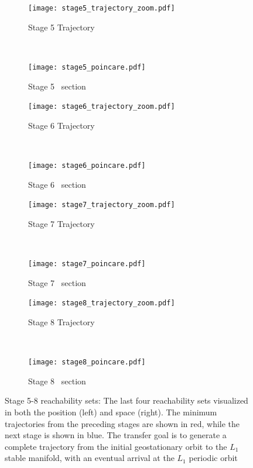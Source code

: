 \documentclass[smallcondensed]{svjour3}
\begin{document}
\begin{figure}[htbp]
    \centering
    \begin{subfigure}[htbp]{0.5\textwidth} 
        \texttt{[image: stage5\_trajectory\_zoom.pdf]} 
        \caption{Stage 5 Trajectory~\label{fig:stage5_trajecotry_zoom}} 
    \end{subfigure}~
    \begin{subfigure}[htbp]{0.5\textwidth} 
        \texttt{[image: stage5\_poincare.pdf]} 
        \caption{Stage 5 \Poincare~section \label{fig:stage5_poincare}} 
    \end{subfigure}

    \begin{subfigure}[htbp]{0.5\textwidth} 
        \texttt{[image: stage6\_trajectory\_zoom.pdf]} 
        \caption{Stage 6 Trajectory~\label{fig:stage6_trajecotry_zoom}} 
    \end{subfigure}~
    \begin{subfigure}[htbp]{0.5\textwidth} 
        \texttt{[image: stage6\_poincare.pdf]} 
        \caption{Stage 6 \Poincare~section \label{fig:stage6_poincare}} 
    \end{subfigure}

    \begin{subfigure}[htbp]{0.5\textwidth} 
        \texttt{[image: stage7\_trajectory\_zoom.pdf]} 
        \caption{Stage 7 Trajectory~\label{fig:stage7_trajecotry_zoom}} 
    \end{subfigure}~
    \begin{subfigure}[htbp]{0.5\textwidth} 
        \texttt{[image: stage7\_poincare.pdf]} 
        \caption{Stage 7 \Poincare~section \label{fig:stage7_poincare}} 
    \end{subfigure}
 
    \begin{subfigure}[htbp]{0.5\textwidth} 
        \texttt{[image: stage8\_trajectory\_zoom.pdf]} 
        \caption{Stage 8 Trajectory~\label{fig:stage8_trajecotry_zoom}} 
    \end{subfigure}~
    \begin{subfigure}[htbp]{0.5\textwidth} 
        \texttt{[image: stage8\_poincare.pdf]} 
        \caption{Stage 8 \Poincare~section \label{fig:stage8_poincare}} 
    \end{subfigure}   
    \caption{Stage 5-8 reachability sets: The last four reachability sets visualized in both the position (left) and \Poincare space (right).
        The minimum trajectories from the preceding stages are shown in red, while the next stage is shown in blue.
    The transfer goal is to generate a complete trajectory from the initial geostationary orbit to the \( L_1 \) stable manifold, with an eventual arrival at the \( L_1 \) periodic orbit~\label{fig:stage5to8_reachability}}
\end{figure}
\end{document}
